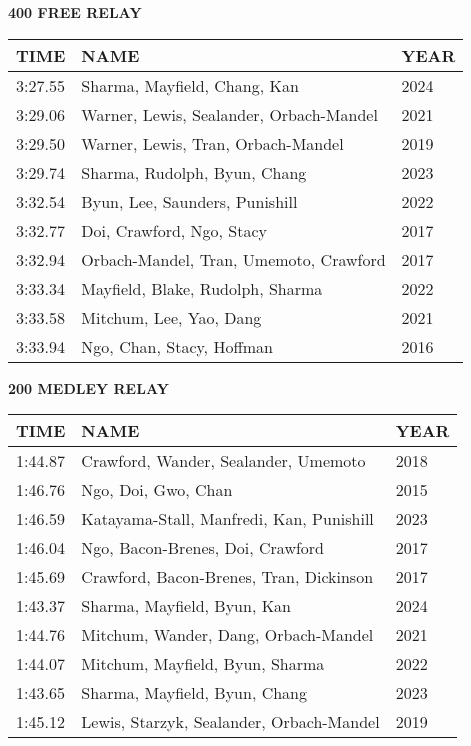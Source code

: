 \vspace{0.4cm}

\begin{center}
\begin{minipage}[t]{0.7\textwidth}
\centering
\textbf{400 FREE RELAY}\\[0.05cm]
\begin{tabular}{@{}p{1.8cm}p{2.8cm}p{1.2cm}@{}}
\hline
\textbf{TIME} & \textbf{NAME} & \textbf{YEAR} \\
\hline
3:27.55 & Sharma, Mayfield, Chang, Kan & 2024 \\
3:29.06 & Warner, Lewis, Sealander, Orbach-Mandel & 2021 \\
3:29.50 & Warner, Lewis, Tran, Orbach-Mandel & 2019 \\
3:29.74 & Sharma, Rudolph, Byun, Chang & 2023 \\
3:32.54 & Byun, Lee, Saunders, Punishill & 2022 \\
3:32.77 & Doi, Crawford, Ngo, Stacy & 2017 \\
3:32.94 & Orbach-Mandel, Tran, Umemoto, Crawford & 2017 \\
3:33.34 & Mayfield, Blake, Rudolph, Sharma & 2022 \\
3:33.58 & Mitchum, Lee, Yao, Dang & 2021 \\
3:33.94 & Ngo, Chan, Stacy, Hoffman & 2016 \\
\hline
\end{tabular}
\end{minipage}
\end{center}

\vspace{0.4cm}

\begin{center}
\begin{minipage}[t]{0.7\textwidth}
\centering
\textbf{200 MEDLEY RELAY}\\[0.05cm]
\begin{tabular}{@{}p{1.8cm}p{2.8cm}p{1.2cm}@{}}
\hline
\textbf{TIME} & \textbf{NAME} & \textbf{YEAR} \\
\hline
1:44.87 & Crawford, Wander, Sealander, Umemoto & 2018 \\
1:46.76 & Ngo, Doi, Gwo, Chan & 2015 \\
1:46.59 & Katayama-Stall, Manfredi, Kan, Punishill & 2023 \\
1:46.04 & Ngo, Bacon-Brenes, Doi, Crawford & 2017 \\
1:45.69 & Crawford, Bacon-Brenes, Tran, Dickinson & 2017 \\
1:43.37 & Sharma, Mayfield, Byun, Kan & 2024 \\
1:44.76 & Mitchum, Wander, Dang, Orbach-Mandel & 2021 \\
1:44.07 & Mitchum, Mayfield, Byun, Sharma & 2022 \\
1:43.65 & Sharma, Mayfield, Byun, Chang & 2023 \\
1:45.12 & Lewis, Starzyk, Sealander, Orbach-Mandel & 2019 \\
\hline
\end{tabular}
\end{minipage}
\end{center}

